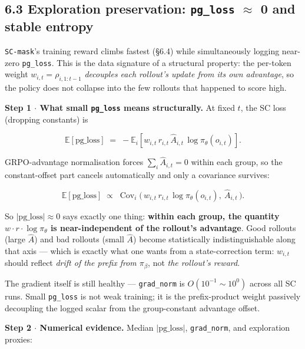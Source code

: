 \documentclass[11pt,a4paper]{article}
\theoremstyle{remark}
\begin{document}
\subsection*{6.3 Exploration preservation: \texttt{pg\_loss} $\approx$ 0 and stable entropy}

\texttt{SC-mask}'s training reward climbs fastest (§6.4) while simultaneously logging near-zero \texttt{pg\_loss}. This is the data signature of a structural property: the per-token weight $w_{i,t}=\rho_{i,1:t-1}$ \emph{decouples each rollout's update from its own advantage}, so the policy does not collapse into the few rollouts that happened to score high.

\textbf{Step 1 $\cdot$ What small \texttt{pg\_loss} means structurally.} At fixed $t$, the SC loss (dropping constants) is

\begin{equation*}
\mathbb E[\text{pg\_loss}] \;=\; -\mathbb E_i\!\left[w_{i,t}\,r_{i,t}\,\hat A_{i,t}\,\log\pi_\theta(o_{i,t})\right].
\end{equation*}

GRPO-advantage normalisation forces $\sum_i\hat A_{i,t}=0$ within each group, so the constant-offset part cancels automatically and only a covariance survives:

\begin{equation*}
\mathbb E[\text{pg\_loss}] \;\propto\; \operatorname{Cov}_i\!\Big(\,w_{i,t}\,r_{i,t}\,\log\pi_\theta(o_{i,t}),\ \hat A_{i,t}\,\Big).
\end{equation*}

So $|\text{pg\_loss}|\approx 0$ says exactly one thing: \textbf{within each group, the quantity $w\!\cdot\! r\!\cdot\!\log\pi_\theta$ is near-independent of the rollout's advantage}. Good rollouts (large $\hat A$) and bad rollouts (small $\hat A$) become statistically indistinguishable along that axis --- which is exactly what one wants from a state-correction term: $w_{i,t}$ should reflect \emph{drift of the prefix from $\pi_\beta$}, not \emph{the rollout's reward}.

The gradient itself is still healthy --- \texttt{grad\_norm} is $O(10^{-1}\sim 10^0)$ across all SC runs. Small \texttt{pg\_loss} is not weak training; it is the prefix-product weight passively decoupling the logged scalar from the group-constant advantage offset.

\textbf{Step 2 $\cdot$ Numerical evidence.} Median $|\text{pg\_loss}|$, \texttt{grad\_norm}, and exploration proxies:
\end{document}
